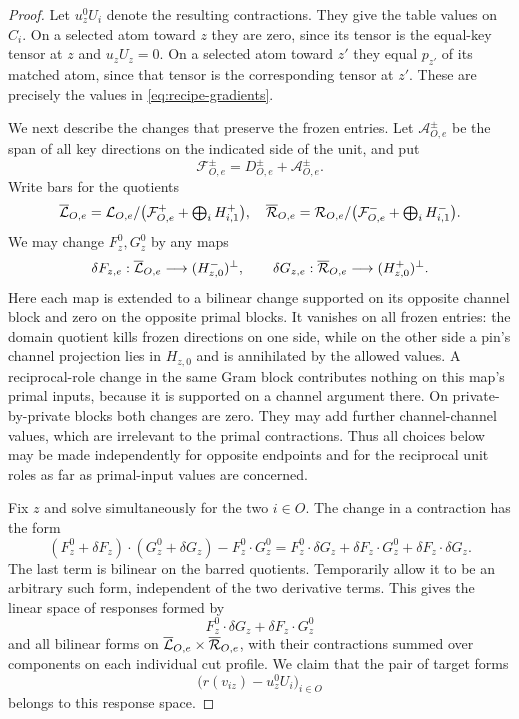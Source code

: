 \begin{proof}
Let $u_z^0U_i$ denote the resulting contractions.  They give
the table values on $C_i$.  On a selected atom toward $z$ they
are zero, since its tensor is the equal-key tensor at $z$ and
$u_zU_z=0$.  On a selected atom toward $z'$ they equal
$p_{z'}$ of its matched atom, since that tensor is the
corresponding tensor at $z'$.  These are precisely the values
in \eqref{eq:recipe-gradients}.

We next describe the changes that preserve the frozen entries.
Let $\mathcal A_{O,e}^{\pm}$ be the span of all key directions
on the indicated side of the unit, and put
\[
 \mathcal F_{O,e}^{\pm}=D_{O,e}^{\pm}+\mathcal A_{O,e}^{\pm}.
\]
Write bars for the quotients
\[
 \overline{\mathcal L}_{O,e}
 =\mathcal L_{O,e}/\bigl(\mathcal F_{O,e}^{+}
                      +\textstyle\bigoplus_iH_{i,1}^{+}\bigr),
 \quad
 \overline{\mathcal R}_{O,e}
 =\mathcal R_{O,e}/\bigl(\mathcal F_{O,e}^{-}
                      +\textstyle\bigoplus_iH_{i,1}^{-}\bigr).
\]
We may change $F_z^0,G_z^0$ by any maps
\begin{equation}\label{eq:allowed-channel-changes}
 \delta F_{z,e}:\overline{\mathcal L}_{O,e}
                     \longrightarrow(H_{z,0}^-)^\perp,
 \qquad
 \delta G_{z,e}:\overline{\mathcal R}_{O,e}
                     \longrightarrow(H_{z,0}^+)^\perp.
\end{equation}
Here each map is extended to a bilinear change supported on
its opposite channel block and zero on the opposite primal
blocks.  It vanishes on all frozen entries: the domain
quotient kills frozen directions on one side, while on the
other side a pin's channel projection lies in $H_{z,0}$ and
is annihilated by the allowed values.  A reciprocal-role
change in the same Gram block contributes nothing on this
map's primal inputs, because it is supported on a channel
argument there.  On private-by-private blocks both changes
are zero.  They may add further channel-channel values, which
are irrelevant to the primal contractions.  Thus all choices
below may be made independently for opposite endpoints and
for the reciprocal unit roles as far as primal-input values
are concerned.

Fix $z$ and solve simultaneously for the two $i\in O$.
The change in a contraction has the form
\[
 (F_z^0+\delta F_z)\cdot(G_z^0+\delta G_z)
      -F_z^0\cdot G_z^0
 =F_z^0\cdot\delta G_z+\delta F_z\cdot G_z^0
      +\delta F_z\cdot\delta G_z.
\]
The last term is bilinear on the barred quotients.  Temporarily
allow it to be an arbitrary such form, independent of the two
derivative terms.  This gives the linear space of responses formed by
\[
 F_z^0\cdot\delta G_z+\delta F_z\cdot G_z^0
\]
and all bilinear forms on
$\overline{\mathcal L}_{O,e}\times\overline{\mathcal R}_{O,e}$, with their
contractions summed over components on each individual cut
profile.  We claim that the pair of target forms
\begin{equation}\label{eq:target-difference}
 \bigl(r(v_{iz})-u_z^0U_i\bigr)_{i\in O}
\end{equation}
belongs to this response space.


\end{proof}
